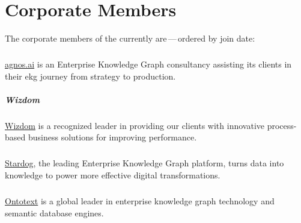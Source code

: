 \chapter{Corporate Members}
\label{appendix:ekgf-corporate-members}

The corporate members of the  currently are\,---\,ordered by join date:

\paragraph{\agnos}
\label{agnos}

\href{https://agnos.ai}{agnos.ai} is an Enterprise Knowledge Graph consultancy assisting its clients in
their \gls{ekg} journey from strategy to production.

\paragraph{Wizdom}
\label{wizdom}

\href{http://www.wizdom.com/}{Wizdom} is a recognized leader in providing our clients with
innovative process-based business solutions for improving performance.

\paragraph{\stardogcompany}
\label{stardog}

\href{https://www.stardog.com/}{Stardog}, the leading Enterprise Knowledge Graph platform,
turns data into knowledge to power more effective digital transformations.

\paragraph{\ontotext}
\label{ontotext}

\href{https://www.ontotext.com/}{Ontotext} is a global leader in enterprise knowledge graph technology
and semantic database engines.

\paragraph{\dataworld}
\label{dataworld}

